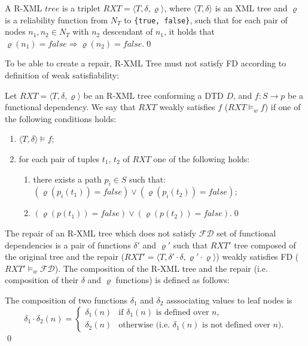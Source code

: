 \begin{define}\label{rxmlTree}
A R-XML $tree$ is a triplet $RXT = \langle T, \delta, \varrho \rangle$, where $\langle T, \delta \rangle$ is an XML tree and $\varrho$ is a reliability function from $N_T$ to \texttt{\{true, false\}}, such that for each pair of nodes $n_1 , n_2 \in N_T$ with $n_2$ descendant of $n_1$, it holds that $\varrho(n_1) = false \Rightarrow \varrho(n_2) = false$.\qed
\end{define}

To be able to create a repair, R-XML Tree must not satisfy FD according to definition of weak satisfiability:

\begin{define}\label{weakSatisf}
Let $RXT = \langle T, \delta, \varrho \rangle$ be an R-XML tree conforming a DTD $D$, and $f: S \rightarrow p$ be a functional dependency. We say that $RXT$ weakly satisfies $f$ ($RXT \models_w f$) if one of the following conditions holds:
\begin{enumerate}
	\item $\langle T, \delta \rangle \models f$;
    \item for each pair of tuples $t_1$, $t_2$ of $RXT$ one of the following holds:
    \begin{enumerate}
    	\item there exists a path $p_i \in S$ such that: \\
$(\varrho(p_i(t_1)) = false) \lor (\varrho(p_i(t_2)) = false)$;
        \item $(\varrho(p(t_1)) = false) \lor (\varrho(p(t_2)) = false)$.\qed
    \end{enumerate}
\end{enumerate}
\end{define}

The repair of an R-XML tree which does not satisfy $\mathcal{FD}$ set of functional dependencies is a pair of functions $\delta'$ and $\varrho'$ such that $RXT'$ tree composed of the original tree and the repair ($RXT' = \langle T, \delta' \cdot \delta, \varrho' \cdot \varrho \rangle$) weakly satisfies FD ($RXT' \models_w \mathcal{FD}$). The composition of the R-XML tree and the repair (i.e. composition of their $\delta$ and $\varrho$ functions) is defined as follows:

\begin{define}\label{compDelta}
The composition of two functions $\delta_1$ and $\delta_2$ asssociating values to leaf nodes is
\begin{displaymath}
    \delta_1 \cdot \delta_2(n) =
        \begin{cases}
            \delta_1(n) & \text{if $\delta_1(n)$ is defined over $n$,}\\
            \delta_2(n) & \text{otherwise (i.e. $\delta_1(n)$ is not defined over $n$).}
        \end{cases}
\end{displaymath}\qed
\end{define}

